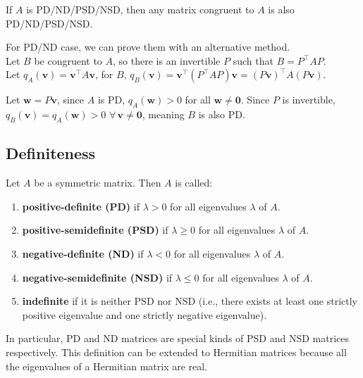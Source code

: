 \begin{corollary}
If $A$ is PD/ND/PSD/NSD, then any matrix congruent to $A$ is also PD/ND/PSD/NSD.
\end{corollary}

\begin{pfbox}
For PD/ND case, we can prove them with an alternative method.\\
Let $B$ be congruent to $A$, so there is an invertible $P$ such that $B=P^\top AP$.\\
Let $q_A(\mathbf{v})=\mathbf{v}^\top A\mathbf{v}$, for $B$, $q_B(\mathbf{v})=\mathbf{v}^\top(P^\top AP)\mathbf{v}=(P\mathbf{v})^\top A(P\mathbf{v})$.

Let $\mathbf{w}=P\mathbf{v}$, since $A$ is PD,
$q_A(\mathbf{w})>0 $ for all $\mathbf{w}\ne \mathbf{0}$. 
Since $P$ is invertible, $q_B(\mathbf{v})=q_A(\mathbf{w})>0\,\,\forall\,\mathbf{v}\ne\mathbf{0}$, meaning $B$ is also PD.
\end{pfbox}

\subsection{Definiteness}

\begin{definition}[Definiteness]
	Let $A$ be a symmetric matrix. Then $A$ is called:
	\begin{enumerate}
		\item \textbf{positive-definite (PD)} if $\lambda > 0$ for all eigenvalues $\lambda$ of $A$.
		\item \textbf{positive-semidefinite (PSD)} if $\lambda \ge 0$ for all eigenvalues $\lambda$ of $A$.
		\item \textbf{negative-definite (ND)} if $\lambda < 0$ for all eigenvalues $\lambda$ of $A$.
		\item \textbf{negative-semidefinite (NSD)} if $\lambda \le 0$ for all eigenvalues $\lambda$ of $A$.
		\item \textbf{indefinite} if it is neither PSD nor NSD (i.e., there exists at least one strictly positive eigenvalue and one strictly negative eigenvalue).
	\end{enumerate}
\end{definition}

\begin{remark}
	In particular, PD and ND matrices are special kinds of PSD and NSD matrices respectively. This definition can be extended to Hermitian matrices because all the eigenvalues of a Hermitian matrix are real.
\end{remark}


